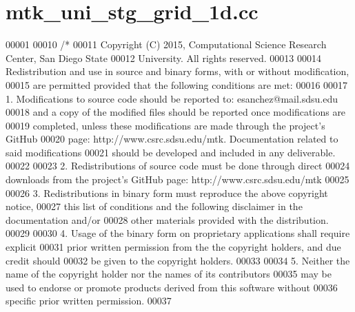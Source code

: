 \hypertarget{mtk__uni__stg__grid__1d_8cc_source}{\section{mtk\+\_\+uni\+\_\+stg\+\_\+grid\+\_\+1d.\+cc}
\label{mtk__uni__stg__grid__1d_8cc_source}
}

\begin{DoxyCode}
00001 
00010 \textcolor{comment}{/*}
00011 \textcolor{comment}{Copyright (C) 2015, Computational Science Research Center, San Diego State}
00012 \textcolor{comment}{University. All rights reserved.}
00013 \textcolor{comment}{}
00014 \textcolor{comment}{Redistribution and use in source and binary forms, with or without modification,}
00015 \textcolor{comment}{are permitted provided that the following conditions are met:}
00016 \textcolor{comment}{}
00017 \textcolor{comment}{1. Modifications to source code should be reported to: esanchez@mail.sdsu.edu}
00018 \textcolor{comment}{and a copy of the modified files should be reported once modifications are}
00019 \textcolor{comment}{completed, unless these modifications are made through the project's GitHub}
00020 \textcolor{comment}{page: http://www.csrc.sdsu.edu/mtk. Documentation related to said modifications}
00021 \textcolor{comment}{should be developed and included in any deliverable.}
00022 \textcolor{comment}{}
00023 \textcolor{comment}{2. Redistributions of source code must be done through direct}
00024 \textcolor{comment}{downloads from the project's GitHub page: http://www.csrc.sdsu.edu/mtk}
00025 \textcolor{comment}{}
00026 \textcolor{comment}{3. Redistributions in binary form must reproduce the above copyright notice,}
00027 \textcolor{comment}{this list of conditions and the following disclaimer in the documentation and/or}
00028 \textcolor{comment}{other materials provided with the distribution.}
00029 \textcolor{comment}{}
00030 \textcolor{comment}{4. Usage of the binary form on proprietary applications shall require explicit}
00031 \textcolor{comment}{prior written permission from the the copyright holders, and due credit should}
00032 \textcolor{comment}{be given to the copyright holders.}
00033 \textcolor{comment}{}
00034 \textcolor{comment}{5. Neither the name of the copyright holder nor the names of its contributors}
00035 \textcolor{comment}{may be used to endorse or promote products derived from this software without}
00036 \textcolor{comment}{specific prior written permission.}
00037 \textcolor{comment}{}

\end{DoxyCode}
